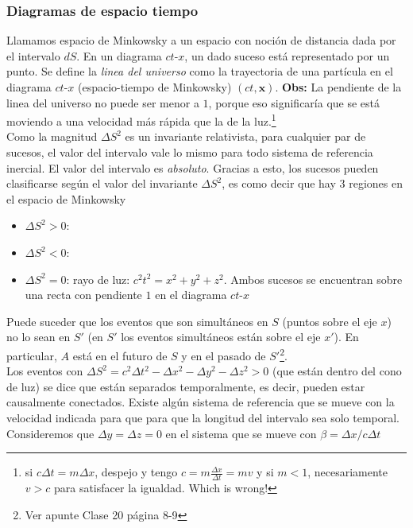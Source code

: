 

\subsubsection{Diagramas de espacio tiempo}
Llamamos espacio de Minkowsky a un espacio con noción de distancia dada por el intervalo $dS$. En un diagrama $ct$-$x$, un dado suceso está representado por un punto. Se define la \textit{linea del universo} como la trayectoria de una partícula en el diagrama $ct$-$x$ (espacio-tiempo de Minkowsky) $(ct, \textbf{x})$. \textbf{Obs:} La pendiente de la linea del universo no puede ser menor a $1$, porque eso significaría que se está moviendo a una velocidad más rápida que la de la luz.\footnote{si $c\Delta t = m\Delta x$, despejo y tengo $c = m \frac{\Delta x}{\Delta t} = m v$ y si $m<1$, necesariamente $v > c$ para satisfacer la igualdad. Which is wrong!}\\
\indent Como la magnitud $\Delta S^{2}$ es un invariante relativista, para cualquier par de sucesos, el valor del intervalo vale lo mismo para todo sistema de referencia inercial. El valor del intervalo es \textit{absoluto}. Gracias a esto, los sucesos pueden clasificarse según el valor del invariante $\Delta S^{2}$, es como decir que hay 3 regiones en el espacio de Minkowsky
\begin{itemize}
    \item $\Delta S^{2} > 0$:
    \item $\Delta S^{2} < 0$:
    \item $\Delta S^{2} = 0$: rayo de luz: $c^{2}t^{2} = x^{2} + y^{2} + z^{2}$. Ambos sucesos se encuentran sobre una recta con pendiente $1$ en el diagrama $ct$-$x$
\end{itemize}
Puede suceder que los eventos que son simultáneos en $S$ (puntos sobre el eje $x$) no lo sean en $S'$ (en $S'$ los eventos simultáneos están sobre el eje $x'$). En particular, $A$ está en el futuro de $S$ y en el pasado de $S'$\footnote{Ver apunte Clase 20 página 8-9}.\\
\indent Los eventos con $\Delta S^{2} = c^{2}\Delta t^{2} - \Delta x^{2} - \Delta y^{2} - \Delta z^{2} > 0$ (que están dentro del cono de luz) se dice que están separados temporalmente, es decir, pueden estar causalmente conectados. Existe algún sistema de referencia que se mueve con la velocidad indicada para que para que la longitud del intervalo sea solo temporal. Consideremos que $\Delta y = \Delta z = 0$ en el sistema que se mueve con $\beta = \Delta x/c\Delta t$
